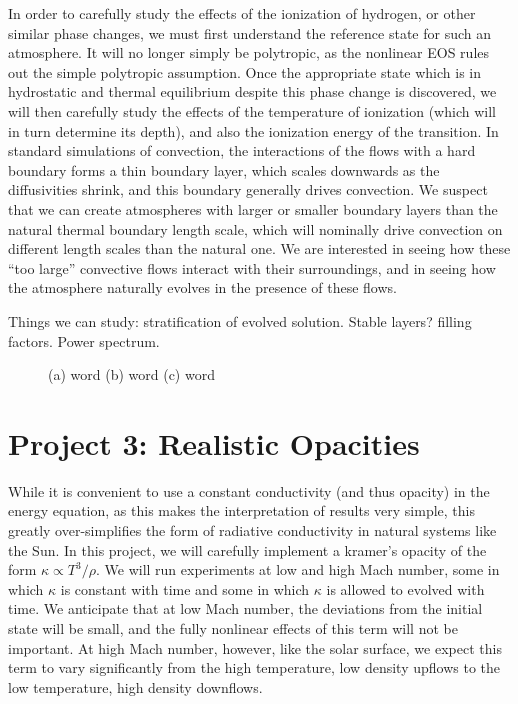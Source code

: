 \documentclass[aasms,12pt]{article}
\begin{document}
In order to carefully study the effects of the ionization of hydrogen, or other similar phase
changes, we must first understand the reference state for such an atmosphere.  It will no longer
simply be polytropic, as the nonlinear EOS rules out the simple polytropic assumption. Once the
appropriate state which is in hydrostatic and thermal equilibrium despite this phase change is discovered,
we will then carefully study the effects of the temperature of ionization (which will in turn
determine its depth), and also the ionization energy of the transition.  In standard simulations
of convection, the interactions of the flows with a hard boundary forms a thin boundary layer,
which scales downwards as the diffusivities shrink, and this boundary generally drives convection.
We suspect that we can create atmospheres with larger or smaller boundary layers than the natural
thermal boundary length scale, which will nominally drive convection on different length scales
than the natural one.  We are interested in seeing how these ``too large'' convective flows
interact with their surroundings, and in seeing how the atmosphere naturally evolves in the presence
of these flows.

Things we can study: stratification of evolved solution.  Stable layers?  filling factors.
Power spectrum.

\begin{figure}[t!]
\centering
\caption{(a) word (b) word (c) word
	\label{fig:fig2}}
\end{figure}

\section{Project 3: Realistic Opacities}
While it is convenient to use a constant conductivity (and thus opacity) in the energy
equation, as this makes the interpretation of results very simple, this greatly 
over-simplifies the form of radiative conductivity in natural systems like the Sun.
In this project, we will carefully implement a kramer's opacity of the form
$\kappa \propto T^3 / \rho$.  We will run experiments at low and high Mach number,
some in which $\kappa$ is constant with time and some in which $\kappa$ is allowed to
evolved with time.  We anticipate that at low Mach number, the deviations from the initial state
will be small, and the fully nonlinear effects of this term will not be important.  At high
Mach number, however, like the solar surface, we expect this term to vary significantly
from the high temperature, low density upflows to the low temperature, high density downflows.
\end{document}
